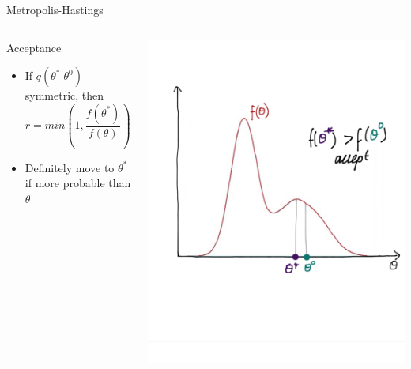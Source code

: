 \documentclass[compress]{beamer}
\begin{document}
\begin{frame}[label=sec-7-6]{Metropolis-Hastings}
\begin{columns}[c] 
\begin{block}{Acceptance}
\begin{itemize}
\item If $q(\theta^*|\theta^{0})$ symmetric, then 
$$ r = min(1,\dfrac{f(\theta^*)}{f(\theta)})$$
\item Definitely move to $\theta^*$ if more probable than $\theta$ 
\end{itemize}
\end{block}

\includegraphics[width=0.8\linewidth]{MH3}
\end{columns}
\end{frame}
\end{document}
